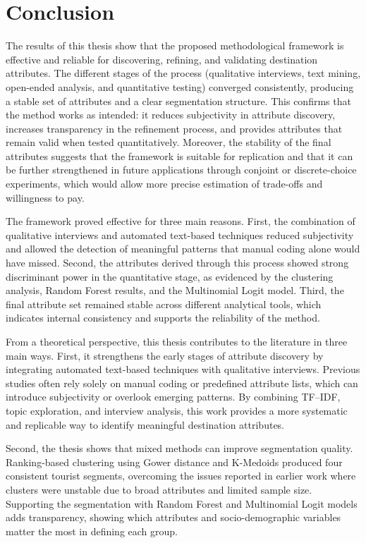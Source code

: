 \documentclass[a4paper, 12pt, twoside]{report}  %
\begin{document}
\chapter*{Conclusion}

\indent The results of this thesis show that the proposed methodological framework is effective and reliable for discovering, refining, and validating destination attributes. The different stages of the process (qualitative interviews, text mining, open-ended analysis, and quantitative testing) converged consistently, producing a stable set of attributes and a clear segmentation structure. This confirms that the method works as intended: it reduces subjectivity in attribute discovery, increases transparency in the refinement process, and provides attributes that remain valid when tested quantitatively. Moreover, the stability of the final attributes suggests that the framework is suitable for replication and that it can be further strengthened in future applications through conjoint or discrete-choice experiments, which would allow more precise estimation of trade-offs and willingness to pay.

\indent The framework proved effective for three main reasons. First, the combination of qualitative interviews and automated text-based techniques reduced subjectivity and allowed the detection of meaningful patterns that manual coding alone would have missed. Second, the attributes derived through this process showed strong discriminant power in the quantitative stage, as evidenced by the clustering analysis, Random Forest results, and the Multinomial Logit model. Third, the final attribute set remained stable across different analytical tools, which indicates internal consistency and supports the reliability of the method.

\indent From a theoretical perspective, this thesis contributes to the literature in three main ways. First, it strengthens the early stages of attribute discovery by integrating automated text-based techniques with qualitative interviews. Previous studies often rely solely on manual coding or predefined attribute lists, which can introduce subjectivity or overlook emerging patterns. By combining TF–IDF, topic exploration, and interview analysis, this work provides a more systematic and replicable way to identify meaningful destination attributes.

\indent Second, the thesis shows that mixed methods can improve segmentation quality. Ranking-based clustering using Gower distance and K-Medoids produced four consistent tourist segments, overcoming the issues reported in earlier work where clusters were unstable due to broad attributes and limited sample size. Supporting the segmentation with Random Forest and Multinomial Logit models adds transparency, showing which attributes and socio-demographic variables matter the most in defining each group.
\end{document}
